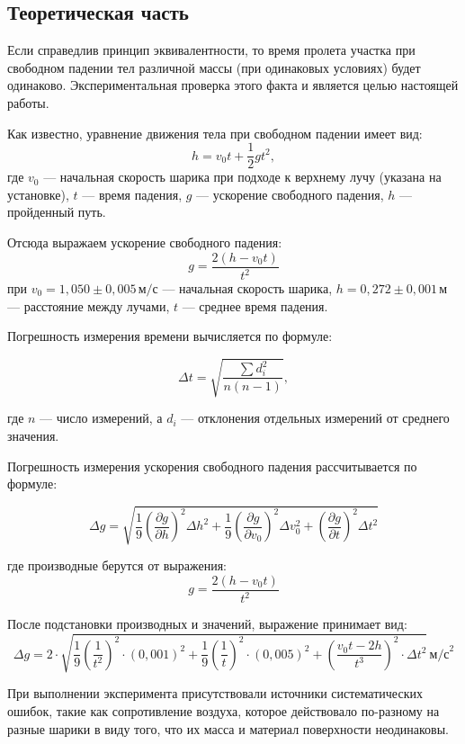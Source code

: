 \subsection{Теоретическая часть}
Если справедлив принцип эквивалентности, то время пролета участка при
свободном падении тел различной массы (при одинаковых условиях) будет одинаково.
Экспериментальная проверка этого факта и является целью настоящей работы.

Как известно, уравнение движения тела при свободном падении имеет вид:
\begin{equation}
h = v_0 t + \frac{1}{2} g t^2, \label{eq:fall}
\end{equation}
где \( v_0 \) — начальная скорость шарика при подходе к верхнему лучу (указана на установке),  
\( t \) — время падения, \( g \) — ускорение свободного падения, \( h \) — пройденный путь.

Отсюда выражаем ускорение свободного падения:
\[
g = \frac{2(h - v_0 t)}{t^2}
\]
при \( v_0 = 1{,}050 \pm 0{,}005 \, \text{м/с} \) — начальная скорость шарика, 
\( h = 0{,}272 \pm 0{,}001 \, \text{м} \) — расстояние между лучами, 
\( t \) — среднее время падения.


Погрешность измерения времени вычисляется по формуле:

\begin{equation}
\Delta t = \sqrt{ \frac{\sum d_i^2}{n(n - 1)} },
\end{equation}

где \( n \) — число измерений, а \( d_i \) — отклонения отдельных измерений от среднего значения.

Погрешность измерения ускорения свободного падения рассчитывается по формуле:

\[
\Delta g = \sqrt{ 
\frac{1}{9} \left( \frac{\partial g}{\partial h} \right)^2 \Delta h^2 +
\frac{1}{9} \left( \frac{\partial g}{\partial v_0} \right)^2 \Delta v_0^2 +
\left( \frac{\partial g}{\partial t} \right)^2 \Delta t^2
}
\]

где производные берутся от выражения:
\[
g = \frac{2(h - v_0 t)}{t^2}
\]

После подстановки производных и значений, выражение принимает вид:
\[
\Delta g = 2 \cdot \sqrt{
\frac{1}{9} \left( \frac{1}{t^2} \right)^2 \cdot (0{,}001)^2 +
\frac{1}{9} \left( \frac{1}{t} \right)^2 \cdot (0{,}005)^2 +
\left( \frac{v_0 t - 2h}{t^3} \right)^2 \cdot \Delta t^2
}
\, \text{м/с}^2
\]

При выполнении эксперимента присутствовали источники систематических ошибок, такие как сопротивление воздуха, которое действовало по-разному на разные шарики в виду того, что их масса и материал поверхности неодинаковы.

